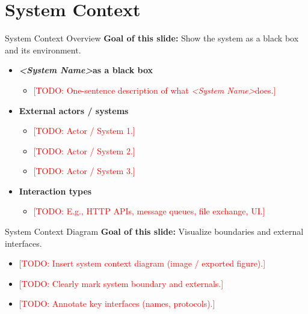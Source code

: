 \documentclass[aspectratio=169]{beamer}
\newcommand{\SystemName}{\textit{<System Name>}}
\newcommand{\TODO}[1]{\textcolor{red}{[TODO: #1]}}
\begin{document}
\section{System Context}

\begin{frame}{System Context Overview}
  \textbf{Goal of this slide:} Show the system as a black box and its environment.

  \begin{itemize}
    \item \textbf{\SystemName as a black box}
      \begin{itemize}
        \item \TODO{One-sentence description of what \SystemName does.}
      \end{itemize}
    \item \textbf{External actors / systems}
      \begin{itemize}
        \item \TODO{Actor / System 1.}
        \item \TODO{Actor / System 2.}
        \item \TODO{Actor / System 3.}
      \end{itemize}
    \item \textbf{Interaction types}
      \begin{itemize}
        \item \TODO{E.g., HTTP APIs, message queues, file exchange, UI.}
      \end{itemize}
  \end{itemize}
\end{frame}

\begin{frame}{System Context Diagram}
  \textbf{Goal of this slide:} Visualize boundaries and external interfaces.

  \begin{itemize}
    \item \TODO{Insert system context diagram (image / exported figure).}
    \item \TODO{Clearly mark system boundary and externals.}
    \item \TODO{Annotate key interfaces (names, protocols).}
  \end{itemize}
\end{frame}
\end{document}
